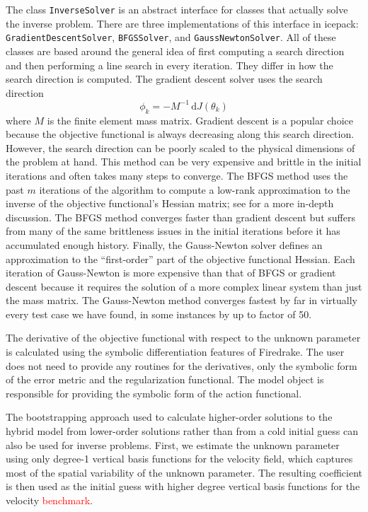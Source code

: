 \documentclass{article}
\theoremstyle{definition}
\theoremstyle{plain}
\newcommand{\ud}{\hspace{2pt}\mathrm{d}}
\begin{document}
The class \texttt{InverseSolver} is an abstract interface for classes that actually solve the inverse problem.
There are three implementations of this interface in icepack: \texttt{GradientDescentSolver}, \texttt{BFGSSolver}, and \texttt{GaussNewtonSolver}.
All of these classes are based around the general idea of first computing a search direction and then performing a line search in every iteration.
They differ in how the search direction is computed.
The gradient descent solver uses the search direction
\begin{equation}
    \phi_k = -M^{-1}\ud J(\theta_k)
\end{equation}
where $M$ is the finite element mass matrix.
Gradient descent is a popular choice because the objective functional is always decreasing along this search direction.
However, the search direction can be poorly scaled to the physical dimensions of the problem at hand.
This method can be very expensive and brittle in the initial iterations and often takes many steps to converge.
The BFGS method uses the past $m$ iterations of the algorithm to compute a low-rank approximation to the inverse of the objective functional's Hessian matrix; see \citet{nocedal2006numerical} for a more in-depth discussion.
The BFGS method converges faster than gradient descent but suffers from many of the same brittleness issues in the initial iterations before it has accumulated enough history.
Finally, the Gauss-Newton solver defines an approximation to the ``first-order'' part of the objective functional Hessian.
Each iteration of Gauss-Newton is more expensive than that of BFGS or gradient descent because it requires the solution of a more complex linear system than just the mass matrix.
The Gauss-Newton method converges fastest by far in virtually every test case we have found, in some instances by up to factor of 50.

The derivative of the objective functional with respect to the unknown parameter is calculated using the symbolic differentiation features of Firedrake.
The user does not need to provide any routines for the derivatives, only the symbolic form of the error metric and the regularization functional.
The model object is responsible for providing the symbolic form of the action functional.

The bootstrapping approach used to calculate higher-order solutions to the hybrid model from lower-order solutions rather than from a cold initial guess can also be used for inverse problems.
First, we estimate the unknown parameter using only degree-1 vertical basis functions for the velocity field, which captures most of the spatial variability of the unknown parameter.
The resulting coefficient is then used as the initial guess with higher degree vertical basis functions for the velocity \textcolor{red}{benchmark}.
\end{document}
